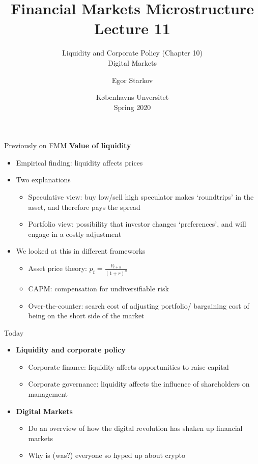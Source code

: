 \documentclass[english,10pt
,aspectratio=169
]{beamer}
\title{Financial Markets Microstructure \\ Lecture 11}
\subtitle{Liquidity and Corporate Policy (Chapter 10)\\
	Digital Markets}
\author{Egor Starkov}
\date{K{\o}benhavns Unversitet \\
	Spring 2020}
\begin{document}
\frame[plain]{\titlepage}


\begin{frame}{Previously on FMM}
	\textbf{Value of liquidity}
	\begin{itemize}
		\item Empirical finding: liquidity affects prices
		\item Two explanations
		\begin{itemize}
			\item Speculative view: buy low/sell high speculator makes `roundtrips' in the asset, and therefore pays the spread
			\item Portfolio view: possibility that investor changes `preferences', and will engage in a costly adjustment
		\end{itemize}
		\item We looked at this in different frameworks
		\begin{itemize}
			\item Asset price theory: $p_{t}= \frac{p_{t+h}}{(1+r)^{h}}$
			\item CAPM: compensation for undiversifiable risk
			\item Over-the-counter: search cost of adjusting portfolio/ bargaining cost of being on the short side of the market
		\end{itemize}
	\end{itemize}
\end{frame}


\begin{frame}{Today}
	\begin{itemize}
		\item \textbf{Liquidity and corporate policy}
		\begin{itemize}
			\item Corporate finance: liquidity affects opportunities to raise capital
			\item Corporate governance: liquidity affects the influence of shareholders on management
		\end{itemize}
		\item \textbf{Digital Markets}
		\begin{itemize}
			\item Do an overview of how the digital revolution has shaken up financial markets
			\item Why is (was?) everyone so hyped up about crypto
		\end{itemize}
	\end{itemize}
\end{frame}
\end{document}
